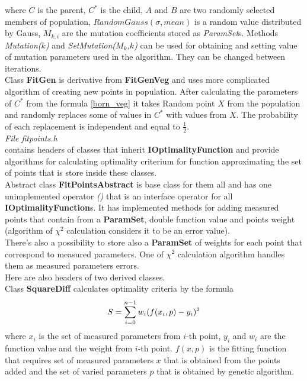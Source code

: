 \documentclass[a4paper]{article}
\begin{document}
where $C$ is the parent, $C^*$ is the child, $A$ and $B$ are two randomly selected members of population, $RandomGauss(\sigma, mean)$ is a random value distributed by Gauss, $M_{k,i}$ are the mutation coefficients stored as \textit{ParamSet}s.
Methods \textit{Mutation($k$)} and \textit{SetMutation($M_k$,$k$)} can be used for obtaining and setting value of mutation parameters used in the algorithm. They can be changed between iterations.
\\
Class \textbf{FitGen} is derivative from \textbf{FitGenVeg} and uses more complicated algorithm of creating new points in population. After calculating the parameters of $C^*$ from the formula \ref{born_veg} it takes Random point $X$ from the population and randomly replaces some of values in $C^*$ with values from $X$. The probability of each replacement is independent and equal to $\frac{1}{2}$.
\\
\textit{\Large File fitpoints.h}\\
contains headers of classes that inherit \textbf{IOptimalityFunction} and provide algorithms for calculating optimality criterium for function approximating the set of points that is store inside these classes.
\\
Abstract class \textbf{FitPointsAbstract} is base class for them all and has one unimplemented operator \textit{()} that is an interface operator for all \textbf{IOptimalityFunction}s. It has implemented methods for adding measured points that contain from a \textbf{ParamSet}, double function value and points weight (algorithm of $\chi^2$ calculation considers it to be an error value).
\\
There's also a possibility to store also a \textbf{ParamSet} of weights for each point that correspond to measured parameters.
One of $\chi^2$ calculation algorithm handles them as measured parameters errors.
\\
Here are also headers of two derived classes.\\
Class \textbf{SquareDiff} calculates optimality criteria by the formula
\begin{equation}\Large
S = \sum_{i=0}^{n-1} w_i (f(x_i, p)-y_i)^2
\end{equation}
where $x_i$ is the set of measured parameters from $i$-th point, $y_i$ and $w_i$ are the function value and the weight from $i$-th point. $f(x,p)$ is the fitting function that requires set of measured parameters $x$ that is obtained from the points added and the set of varied parameters $p$ that is obtained by genetic algorithm.
\\
\end{document}

